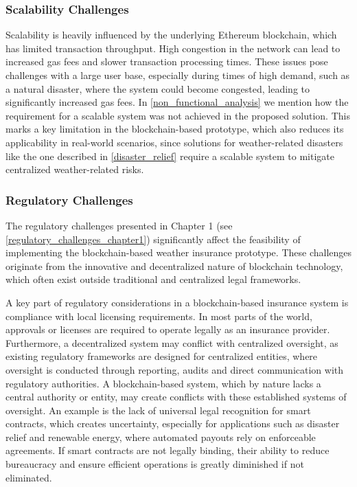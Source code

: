 \subsubsection{Scalability Challenges}\label{scalability_challenges_analysis}
Scalability is heavily influenced by the underlying Ethereum blockchain, which has limited transaction throughput. High congestion in the network can lead to increased gas fees and slower transaction processing times. These issues pose challenges with a large user base, especially during times of high demand, such as a natural disaster, where the system could become congested, leading to significantly increased gas fees. In \cref{non_functional_analysis} we mention how the requirement for a scalable system was not achieved in the proposed solution. This marks a key limitation in the blockchain-based prototype, which also reduces its applicability in real-world scenarios, since solutions for weather-related disasters like the one described in \cref{disaster_relief} require a scalable system to mitigate centralized weather-related risks.

\subsubsection{Regulatory Challenges}
The regulatory challenges presented in Chapter 1 (see \cref{regulatory_challenges_chapter1}) significantly affect the feasibility of implementing the blockchain-based weather insurance prototype. These challenges originate from the innovative and decentralized nature of blockchain technology, which often exist outside traditional and centralized legal frameworks. 

A key part of regulatory considerations in a blockchain-based insurance system is compliance with local licensing requirements. In most parts of the world, approvals or licenses are required to operate legally as an insurance provider. Furthermore, a decentralized system may conflict with centralized oversight, as existing regulatory frameworks are designed for centralized entities, where oversight is conducted through reporting, audits and direct communication with regulatory authorities. A blockchain-based system, which by nature lacks a central authority or entity, may create conflicts with these established systems of oversight. An example is the lack of universal legal recognition for smart contracts, which creates uncertainty, especially for applications such as disaster relief and renewable energy, where automated payouts rely on enforceable agreements. If smart contracts are not legally binding, their ability to reduce bureaucracy and ensure efficient operations is greatly diminished if not eliminated.


